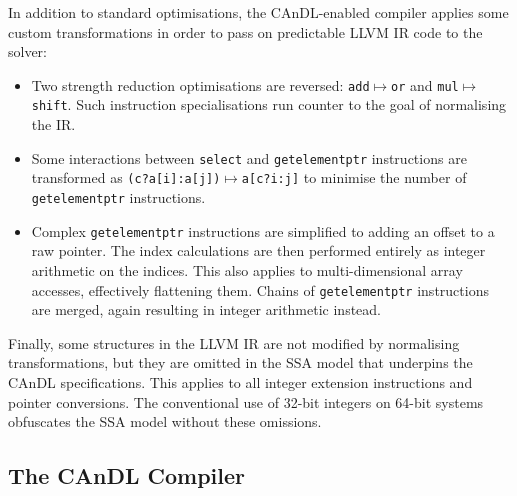     In addition to standard optimisations, the CAnDL-enabled compiler applies
    some custom transformations in order to pass on predictable LLVM IR code
    to the solver:
    \begin{itemize}
        \item Two strength reduction optimisations are reversed:
              {\tt add}$\mapsto${\tt or} and {\tt mul}$\mapsto${\tt shift}.
              Such instruction specialisations run counter to the goal of
              normalising the IR.
        \item Some interactions between {\tt select} and {\tt getelementptr}
              instructions are transformed as
              {\tt (c?a[i]:a[j])}$\mapsto${\tt a[c?i:j]} to minimise the number
              of {\tt getelementptr} instructions.
        \item Complex {\tt getelementptr} instructions are simplified to adding
              an offset to a raw pointer.
              The index calculations are then performed entirely as integer
              arithmetic on the indices.
              This also applies to multi-dimensional array accesses, effectively
              flattening them.
              Chains of {\tt getelementptr} instructions are merged, again
              resulting in integer arithmetic instead.
    \end{itemize}
    Finally, some structures in the LLVM IR are not modified by normalising
    transformations, but they are omitted in the SSA model that underpins the
    CAnDL specifications.
    This applies to all integer extension instructions and pointer conversions.
    The conventional use of 32-bit integers on 64-bit systems obfuscates the
    SSA model without these omissions.

\subsection{The CAnDL Compiler}

